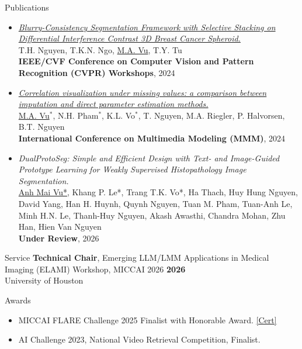 \documentclass[11pt]{resume}
\newcommand{\ptitle}[1]{{\fontsize{10.5}{12}\selectfont \textit{#1}}}
\newcommand{\ptitleb}[1]{{\fontsize{9}{10.5}\selectfont \textbf{#1}}}
\begin{document}
\begin{rSection}{Publications}
\begin{itemize}
          X.-L. Huynh, H.-T. Pham, \underline{Anh Mai Vu}, T.-M. Nguyen, T.Q.K. Bui, T.-B. Nguyen, Q. Nguyen, M.H.N. Le, P.K. Huynh \\
          \ptitleb{MICCAI Workshop on Deep Generative Models (DGM)}, 2025
    \item \href{https://openaccess.thecvf.com/content/CVPR2024W/DEF-AI-MIA/papers/Nguyen_Blurry-Consistency_Segmentation_Framework_with_Selective_Stacking_on_Differential_Interference_Contrast_CVPRW_2024_paper.pdf}{\ptitle{Blurry-Consistency Segmentation Framework with Selective Stacking on Differential Interference Contrast 3D Breast Cancer Spheroid.}} \\
          T.H. Nguyen, T.K.N. Ngo, \underline{M.A. Vu}, T.Y. Tu \\
          \ptitleb{IEEE/CVF Conference on Computer Vision and Pattern Recognition (CVPR) Workshops}, 2024
    \item \href{https://link.springer.com/chapter/10.1007/978-3-031-53302-0_8}{\ptitle{Correlation visualization under missing values: a comparison between imputation and direct parameter estimation methods.}} \\
          \underline{M.A. Vu}$^{*}$, N.H. Pham$^{*}$, K.L. Vo$^{*}$, T. Nguyen, M.A. Riegler, P. Halvorsen, B.T. Nguyen \\
          \ptitleb{International Conference on Multimedia Modeling (MMM)}, 2024
    \item \ptitle{DualProtoSeg: Simple and Efficient Design with Text- and Image-Guided Prototype Learning for Weakly Supervised Histopathology Image Segmentation.} \\
      \underline{Anh Mai Vu*}, Khang P. Le*, Trang T.K. Vo*, Ha Thach, Huy Hung Nguyen, David Yang, Han H. Huynh, Quynh Nguyen, Tuan M. Pham, Tuan-Anh Le, Minh H.N. Le, Thanh-Huy Nguyen, Akash Awasthi, Chandra Mohan, Zhu Han, Hien Van Nguyen \\
      \ptitleb{Under Review}, 2026

\end{itemize}

\end{rSection}

\begin{rSection}{Service}
\textbf{Technical Chair}, Emerging LLM/LMM Applications in Medical Imaging (ELAMI) Workshop, MICCAI 2026 \hfill \textbf{2026} \\
University of Houston
\end{rSection}

\begin{rSection}{Awards}
\begin{itemize}
    \item MICCAI FLARE Challenge 2025 Finalist with Honorable Award. \href{https://drive.google.com/file/d/1MMi4t1MICseOa5s3F3MLBiRWls1amj__/view?usp=sharing}{[Cert]}
    \item AI Challenge 2023, National Video Retrieval Competition, Finalist.
\end{itemize}
\end{rSection}
\end{document}
